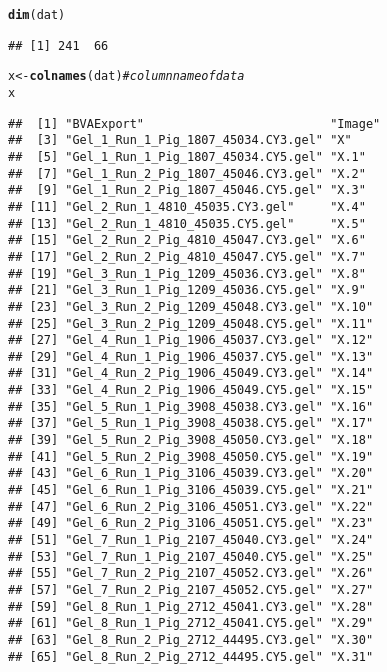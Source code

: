 \documentclass{article}\usepackage[]{graphicx}\usepackage[]{color}
\makeatletter
\newcommand{\hlcom}[1]{\textcolor[rgb]{0.678,0.584,0.686}{\textit{#1}}}%
\newcommand{\hlstd}[1]{\textcolor[rgb]{0.345,0.345,0.345}{#1}}%
\newcommand{\hlkwb}[1]{\textcolor[rgb]{0.69,0.353,0.396}{#1}}%
\newcommand{\hlkwd}[1]{\textcolor[rgb]{0.737,0.353,0.396}{\textbf{#1}}}%
\newenvironment{kframe}{%
 \def\at@end@of@kframe{}%
 \ifinner\ifhmode%
  \def\at@end@of@kframe{\end{minipage}}%
  \begin{minipage}{\columnwidth}%
 \fi\fi%
 \def\FrameCommand##1{\hskip\@totalleftmargin \hskip-\fboxsep
 \colorbox{shadecolor}{##1}\hskip-\fboxsep
     \hskip-\linewidth \hskip-\@totalleftmargin \hskip\columnwidth}%
 \MakeFramed {\advance\hsize-\width
   \@totalleftmargin\z@ \linewidth\hsize
   \@setminipage}}%
 {\par\unskip\endMakeFramed%
 \at@end@of@kframe}
\newenvironment{knitrout}{}{} %
\makeatother
\begin{document}
\begin{knitrout}
\begin{kframe}
\begin{alltt}
\hlkwd{dim}\hlstd{(dat)}
\end{alltt}
\begin{verbatim}
## [1] 241  66
\end{verbatim}
\begin{alltt}
\hlstd{x} \hlkwb{<-} \hlkwd{colnames}\hlstd{(dat)} \hlcom{# column name of data}
\hlstd{x}
\end{alltt}
\begin{verbatim}
##  [1] "BVAExport"                          "Image"                             
##  [3] "Gel_1_Run_1_Pig_1807_45034.CY3.gel" "X"                                 
##  [5] "Gel_1_Run_1_Pig_1807_45034.CY5.gel" "X.1"                               
##  [7] "Gel_1_Run_2_Pig_1807_45046.CY3.gel" "X.2"                               
##  [9] "Gel_1_Run_2_Pig_1807_45046.CY5.gel" "X.3"                               
## [11] "Gel_2_Run_1_4810_45035.CY3.gel"     "X.4"                               
## [13] "Gel_2_Run_1_4810_45035.CY5.gel"     "X.5"                               
## [15] "Gel_2_Run_2_Pig_4810_45047.CY3.gel" "X.6"                               
## [17] "Gel_2_Run_2_Pig_4810_45047.CY5.gel" "X.7"                               
## [19] "Gel_3_Run_1_Pig_1209_45036.CY3.gel" "X.8"                               
## [21] "Gel_3_Run_1_Pig_1209_45036.CY5.gel" "X.9"                               
## [23] "Gel_3_Run_2_Pig_1209_45048.CY3.gel" "X.10"                              
## [25] "Gel_3_Run_2_Pig_1209_45048.CY5.gel" "X.11"                              
## [27] "Gel_4_Run_1_Pig_1906_45037.CY3.gel" "X.12"                              
## [29] "Gel_4_Run_1_Pig_1906_45037.CY5.gel" "X.13"                              
## [31] "Gel_4_Run_2_Pig_1906_45049.CY3.gel" "X.14"                              
## [33] "Gel_4_Run_2_Pig_1906_45049.CY5.gel" "X.15"                              
## [35] "Gel_5_Run_1_Pig_3908_45038.CY3.gel" "X.16"                              
## [37] "Gel_5_Run_1_Pig_3908_45038.CY5.gel" "X.17"                              
## [39] "Gel_5_Run_2_Pig_3908_45050.CY3.gel" "X.18"                              
## [41] "Gel_5_Run_2_Pig_3908_45050.CY5.gel" "X.19"                              
## [43] "Gel_6_Run_1_Pig_3106_45039.CY3.gel" "X.20"                              
## [45] "Gel_6_Run_1_Pig_3106_45039.CY5.gel" "X.21"                              
## [47] "Gel_6_Run_2_Pig_3106_45051.CY3.gel" "X.22"                              
## [49] "Gel_6_Run_2_Pig_3106_45051.CY5.gel" "X.23"                              
## [51] "Gel_7_Run_1_Pig_2107_45040.CY3.gel" "X.24"                              
## [53] "Gel_7_Run_1_Pig_2107_45040.CY5.gel" "X.25"                              
## [55] "Gel_7_Run_2_Pig_2107_45052.CY3.gel" "X.26"                              
## [57] "Gel_7_Run_2_Pig_2107_45052.CY5.gel" "X.27"                              
## [59] "Gel_8_Run_1_Pig_2712_45041.CY3.gel" "X.28"                              
## [61] "Gel_8_Run_1_Pig_2712_45041.CY5.gel" "X.29"                              
## [63] "Gel_8_Run_2_Pig_2712_44495.CY3.gel" "X.30"                              
## [65] "Gel_8_Run_2_Pig_2712_44495.CY5.gel" "X.31"
\end{verbatim}
\end{kframe}
\end{knitrout}
\end{document}
